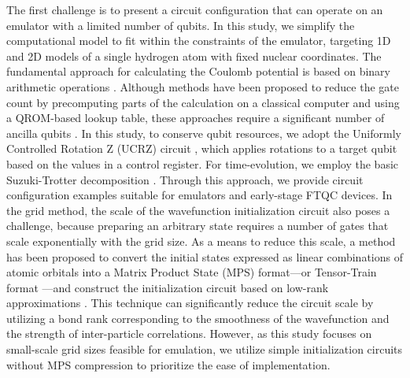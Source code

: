 \documentclass[jctc-draft.tex]{subfiles}
\begin{document}
The first challenge is to present a circuit configuration that can operate on an
emulator with a limited number of qubits. In this study, we simplify the
computational model to fit within the constraints of the emulator, targeting 1D and
2D models of a single hydrogen atom with fixed nuclear coordinates. The
fundamental approach for calculating the Coulomb potential is based on binary
arithmetic operations \cite{Zalka-rspa.1998.0162}. Although methods have been
proposed to reduce the gate count by precomputing parts of the calculation on a
classical computer and using a QROM-based lookup table, these approaches require
a significant number of ancilla qubits \cite{Sanders2020.PRXQuantum.1.020312}.
In this study, to conserve qubit resources, we adopt the Uniformly Controlled
Rotation Z (UCRZ) circuit \cite{Mottonen2004.PhysRevLett.93.130502}, which
applies rotations to a target qubit based on the values in a control register.
For time-evolution, we employ the basic Suzuki-Trotter
decomposition \cite{Zalka-rspa.1998.0162}. Through this approach, we provide
circuit configuration examples suitable for emulators and early-stage FTQC
devices. In the grid method, the scale of the wavefunction initialization
circuit also poses a challenge, because preparing an arbitrary state requires a
number of gates that scale exponentially with the grid size. As a means to
reduce this scale, a method has been proposed to convert the initial states
expressed as linear combinations of atomic orbitals into a Matrix Product State
(MPS) format---or Tensor-Train format
\cite{Oseledets2011.doi:10.1137/090752286}---and construct the initialization
circuit based on low-rank approximations \cite{Huggins2025.PRXQuantum.6.020319}.
This technique can significantly reduce the circuit scale by utilizing a bond
rank corresponding to the smoothness of the wavefunction and the strength of
inter-particle correlations. However, as this study focuses on small-scale
grid sizes feasible for emulation, we utilize simple initialization circuits
without MPS compression to prioritize the ease of implementation. 
\end{document}
